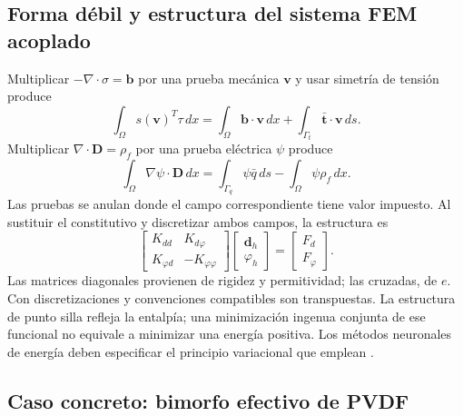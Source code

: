 \subsection{Forma débil y estructura del sistema FEM acoplado}
Multiplicar $-\nabla\cdot\sigma=\mathbf b$ por una prueba mecánica $\mathbf v$ y usar simetría de tensión produce
\begin{equation}
\int_\Omega s(\mathbf v)^T\tau\,dx
=\int_\Omega\mathbf b\cdot\mathbf v\,dx+\int_{\Gamma_t}\bar{\mathbf t}\cdot\mathbf v\,ds.
\end{equation}
Multiplicar $\nabla\cdot\mathbf D=\rho_f$ por una prueba eléctrica $\psi$ produce
\begin{equation}
\int_\Omega\nabla\psi\cdot\mathbf D\,dx
=\int_{\Gamma_q}\psi\bar q\,ds-\int_\Omega\psi\rho_f\,dx.
\end{equation}
Las pruebas se anulan donde el campo correspondiente tiene valor impuesto. Al sustituir el constitutivo y discretizar ambos campos, la estructura es
\begin{equation}
\begin{bmatrix}K_{dd}&K_{d\varphi}\\K_{\varphi d}&-K_{\varphi\varphi}\end{bmatrix}
\begin{bmatrix}\mathbf d_h\\\varphi_h\end{bmatrix}
=\begin{bmatrix}F_d\\F_\varphi\end{bmatrix}.
\label{eq:fem-piezo}
\end{equation}
Las matrices diagonales provienen de rigidez y permitividad; las cruzadas, de $e$. Con discretizaciones y convenciones compatibles son transpuestas. La estructura de punto silla refleja la entalpía; una minimización ingenua conjunta de ese funcional no equivale a minimizar una energía positiva. Los métodos neuronales de energía deben especificar el principio variacional que emplean \cite{lahmer2008,lin2024dem}.

%

\subsection{Caso concreto: bimorfo efectivo de PVDF}
\label{subsec:piezo-bimorfo-expansion}

